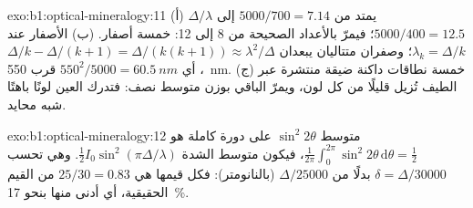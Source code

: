 \begin{solution}{exo:b1:optical-mineralogy:11}
(أ) $\Delta/\lambda$ يمتد من $5000/700 = 7.14$ إلى $5000/400 = 12.5$؛ فيمرّ بالأعداد الصحيحة من 8 إلى 12: خمسة أصفار. (ب) الأصفار عند $\lambda_k = \Delta/k$؛ وصفران متتاليان يبعدان $\Delta/k - \Delta/(k + 1) =
\Delta/(k(k + 1)) \approx \lambda^2/\Delta$، أي $550^2/5000 =
\qty{60.5}{nm}$ قرب \qty{550}{nm}. (ج) خمسة نطاقات داكنة ضيقة منتشرة عبر الطيف تُزيل قليلًا من كل لون، ويمرّ الباقي بوزن متوسط نصف: فتدرك العين لونًا باهتًا شبه محايد.
\end{solution}

\begin{solution}{exo:b1:optical-mineralogy:12}
متوسط $\sin^2 2\theta$ على دورة كاملة هو $\frac1{2\pi}\int_0^{2\pi}\sin^2 2\theta\,
\mathrm d\theta = \frac12$، فيكون متوسط الشدة
$\frac12 I_0\sin^2(\pi\Delta/\lambda)$. وهي تحسب $\delta = \Delta/30000$
بدلًا من $\Delta/25000$ (بالنانومتر): فكل قيمها هي $25/30 = 0.83$ من القيم الحقيقية، أي أدنى منها بنحو \qty{17}{\percent}.
\end{solution}

